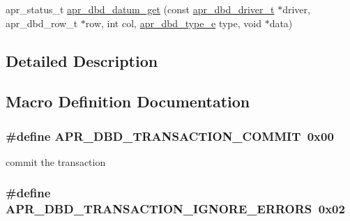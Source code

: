 \begin{DoxyCompactItemize}
\item 
apr\-\_\-status\-\_\-t \hyperlink{group___a_p_r___util___d_b_d_ga67e57ef4eb7952df79ceaa6e92767d41}{apr\-\_\-dbd\-\_\-datum\-\_\-get} (const \hyperlink{structapr__dbd__driver__t}{apr\-\_\-dbd\-\_\-driver\-\_\-t} $\ast$driver, apr\-\_\-dbd\-\_\-row\-\_\-t $\ast$row, int col, \hyperlink{group___a_p_r___util___d_b_d_ga19608fa5d518a5121bee23daacc5c230}{apr\-\_\-dbd\-\_\-type\-\_\-e} type, void $\ast$data)
\end{DoxyCompactItemize}


\subsection{Detailed Description}


\subsection{Macro Definition Documentation}
\hypertarget{group___a_p_r___util___d_b_d_gaff6a26fb3b384bcb3a9172676c53590b}{
\subsubsection[{A\-P\-R\-\_\-\-D\-B\-D\-\_\-\-T\-R\-A\-N\-S\-A\-C\-T\-I\-O\-N\-\_\-\-C\-O\-M\-M\-I\-T}]{\setlength{\rightskip}{0pt plus 5cm}\#define A\-P\-R\-\_\-\-D\-B\-D\-\_\-\-T\-R\-A\-N\-S\-A\-C\-T\-I\-O\-N\-\_\-\-C\-O\-M\-M\-I\-T~0x00}}\label{group___a_p_r___util___d_b_d_gaff6a26fb3b384bcb3a9172676c53590b}
commit the transaction \hypertarget{group___a_p_r___util___d_b_d_gad9dc523b0a3b8dea5b8c9b7b0c281ea2}{
\subsubsection[{A\-P\-R\-\_\-\-D\-B\-D\-\_\-\-T\-R\-A\-N\-S\-A\-C\-T\-I\-O\-N\-\_\-\-I\-G\-N\-O\-R\-E\-\_\-\-E\-R\-R\-O\-R\-S}]{\setlength{\rightskip}{0pt plus 5cm}\#define A\-P\-R\-\_\-\-D\-B\-D\-\_\-\-T\-R\-A\-N\-S\-A\-C\-T\-I\-O\-N\-\_\-\-I\-G\-N\-O\-R\-E\-\_\-\-E\-R\-R\-O\-R\-S~0x02}}\label{group___a_p_r___util___d_b_d_gad9dc523b0a3b8dea5b8c9b7b0c281ea2}
